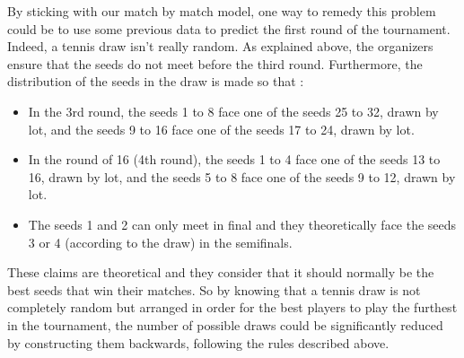 \documentclass[12pt]{article}
\begin{document}
By sticking with our match by match model, one way to remedy this problem could be to use some previous data to predict the first round of the tournament. Indeed, a tennis draw isn't really random. As explained above, the organizers ensure that the seeds do not meet before the third round. Furthermore, the distribution of the seeds in the draw is made so that :
\begin{itemize}
    \item In the 3rd round, the seeds 1 to 8 face one of the seeds 25 to 32, drawn by lot, and the seeds 9 to 16 face one of the seeds 17 to 24, drawn by lot.
    \item In the round of 16 (4th round), the seeds 1 to 4 face one of the seeds 13 to 16, drawn by lot, and the seeds 5 to 8 face one of the seeds 9 to 12, drawn by lot.
    \item The seeds 1 and 2 can only meet in final and they theoretically face the seeds 3 or 4 (according to the draw) in the semifinals.
\end{itemize}
These claims are theoretical and they consider that it should normally be the best seeds that win their matches.
So by knowing that a tennis draw is not completely random but arranged in order for the best players to play the furthest in the tournament, the number of possible draws could be significantly reduced by constructing them backwards, following the rules described above.
\end{document}
